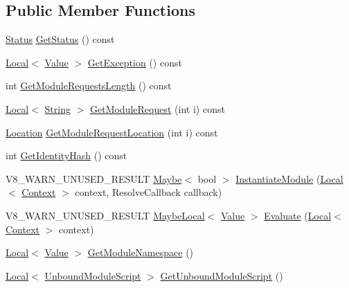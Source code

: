 \subsection*{Public Member Functions}
\begin{DoxyCompactItemize}
\item 
\mbox{\hyperlink{classv8_1_1Module_a9c2a22c9cb8e928d570c38648c648b7e}{Status}} \mbox{\hyperlink{classv8_1_1Module_a6d5b11f191fdb9dc1778ed88333ba2bb}{Get\+Status}} () const
\item 
\mbox{\hyperlink{classv8_1_1Local}{Local}}$<$ \mbox{\hyperlink{classv8_1_1Value}{Value}} $>$ \mbox{\hyperlink{classv8_1_1Module_a74ba40e96b4fd457693f11183ecc1dc4}{Get\+Exception}} () const
\item 
int \mbox{\hyperlink{classv8_1_1Module_a323acfb19889ba4e16b81f1c3d89c2b9}{Get\+Module\+Requests\+Length}} () const
\item 
\mbox{\hyperlink{classv8_1_1Local}{Local}}$<$ \mbox{\hyperlink{classv8_1_1String}{String}} $>$ \mbox{\hyperlink{classv8_1_1Module_a3fc072e8a67c08988740ad652ed928af}{Get\+Module\+Request}} (int i) const
\item 
\mbox{\hyperlink{classv8_1_1Location}{Location}} \mbox{\hyperlink{classv8_1_1Module_a95b5467ac9bcfc120470b6944c7da111}{Get\+Module\+Request\+Location}} (int i) const
\item 
int \mbox{\hyperlink{classv8_1_1Module_aa2966a54ccb783a91ab494407782e9e3}{Get\+Identity\+Hash}} () const
\item 
V8\+\_\+\+W\+A\+R\+N\+\_\+\+U\+N\+U\+S\+E\+D\+\_\+\+R\+E\+S\+U\+LT \mbox{\hyperlink{classv8_1_1Maybe}{Maybe}}$<$ bool $>$ \mbox{\hyperlink{classv8_1_1Module_a2d7d35ce8451c547294fe9964f72d9ca}{Instantiate\+Module}} (\mbox{\hyperlink{classv8_1_1Local}{Local}}$<$ \mbox{\hyperlink{classv8_1_1Context}{Context}} $>$ context, Resolve\+Callback callback)
\item 
V8\+\_\+\+W\+A\+R\+N\+\_\+\+U\+N\+U\+S\+E\+D\+\_\+\+R\+E\+S\+U\+LT \mbox{\hyperlink{classv8_1_1MaybeLocal}{Maybe\+Local}}$<$ \mbox{\hyperlink{classv8_1_1Value}{Value}} $>$ \mbox{\hyperlink{classv8_1_1Module_a0785fa83cd3dde1dee086e1f9d31abdc}{Evaluate}} (\mbox{\hyperlink{classv8_1_1Local}{Local}}$<$ \mbox{\hyperlink{classv8_1_1Context}{Context}} $>$ context)
\item 
\mbox{\hyperlink{classv8_1_1Local}{Local}}$<$ \mbox{\hyperlink{classv8_1_1Value}{Value}} $>$ \mbox{\hyperlink{classv8_1_1Module_a3fd11de1b44b850f3351b2765f32da68}{Get\+Module\+Namespace}} ()
\item 
\mbox{\hyperlink{classv8_1_1Local}{Local}}$<$ \mbox{\hyperlink{classv8_1_1UnboundModuleScript}{Unbound\+Module\+Script}} $>$ \mbox{\hyperlink{classv8_1_1Module_a47dc498d5645eef50ddceb874f5ed3a1}{Get\+Unbound\+Module\+Script}} ()
\end{DoxyCompactItemize}


